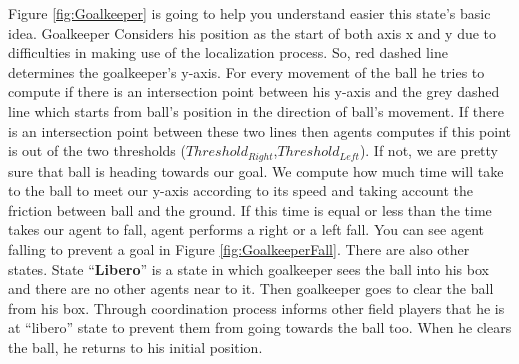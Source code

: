 Figure \ref{fig:Goalkeeper} is going to help you understand easier this state's basic idea. Goalkeeper Considers his position as the start of both axis x and y due to difficulties in making use of the localization process. So, red dashed line determines the goalkeeper's y-axis. For every movement of the ball he tries to compute if there is an intersection point between his y-axis and the grey dashed line which starts from ball's position in the direction of ball's movement. If there is an intersection point between these two lines then agents computes if this point is out of the two thresholds ($Threshold_{Right}$,$Threshold_{Left}$). If not, we are pretty sure that ball is heading towards our goal. We compute how much time will take to the ball to meet our y-axis according to its speed and taking account the friction between ball and the ground. If this time is equal or less than the time takes our agent to fall, agent performs a right or a left fall. You can see agent falling to prevent a goal in Figure \ref{fig:GoalkeeperFall}. There are also other states. State ``\textbf{Libero}'' is a state in which goalkeeper sees the ball into his box and there are no other agents near to it. Then goalkeeper goes to clear the ball from his box. Through coordination process informs other field players that he is at ``libero'' state to prevent them from going towards the ball too. When he clears the ball, he returns to his initial position. 

